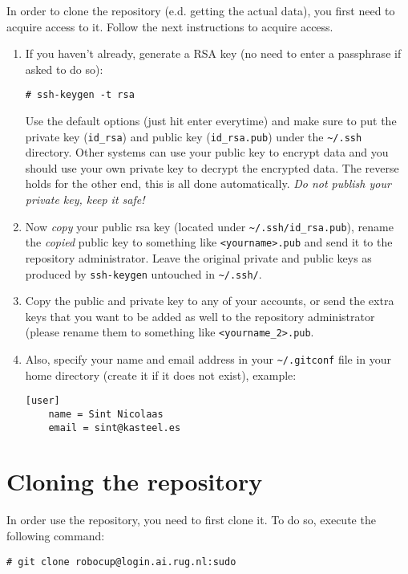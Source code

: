 \documentclass[a4paper, 10pt]{article}
\begin{document}
In order to clone the repository (e.d. getting the actual data), you first need to acquire access to it.
Follow the next instructions to acquire access.
\begin{enumerate}
    \item If you haven't already, generate a RSA key (no need to enter a passphrase if asked to do so):
\begin{lstlisting}
# ssh-keygen -t rsa
\end{lstlisting}
        Use the default options (just hit enter everytime) and make sure to put the private key (\lstinline{id_rsa}) and public key (\lstinline{id_rsa.pub}) under the \lstinline{~/.ssh} directory.
        Other systems can use your public key to encrypt data and you should use your own private key to decrypt the encrypted data.
        The reverse holds for the other end, this is all done automatically.
        \emph{Do not publish your private key, keep it safe!}
    \item Now \emph{copy} your public rsa key (located under \lstinline{~/.ssh/id_rsa.pub}), rename the \emph{copied} public key to something like \lstinline{<yourname>.pub} and send it to the repository administrator. 
        Leave the original private and public keys as produced by \lstinline{ssh-keygen} untouched in \lstinline{~/.ssh/}.
    \item Copy the public and private key to any of your accounts, or send the extra keys that you want to be added as well to the repository administrator (please rename them to something like \lstinline{<yourname_2>.pub}.
    \item Also, specify your name and email address in your \lstinline{~/.gitconf} file in your home directory (create it if it does not exist), example:
\begin{lstlisting}
[user]
    name = Sint Nicolaas
    email = sint@kasteel.es
\end{lstlisting}
\end{enumerate}

\section{Cloning the repository}

In order use the repository, you need to first clone it.
To do so, execute the following command:
\begin{lstlisting}
# git clone robocup@login.ai.rug.nl:sudo
\end{lstlisting}
\end{document}
